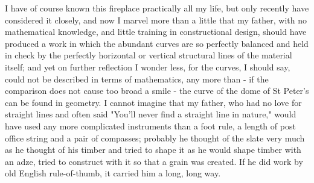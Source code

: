 I have of course known this fireplace practically all my life, but only recently have considered it closely, and now I marvel more than a little that my father, with no mathematical knowledge, and little training in constructional design, should have produced a work in which the abundant curves are so perfectly balanced and held in check by the perfectly horizontal or vertical structural lines of the material itself; and yet on further reflection I wonder less, for the curves, I should say, could not be described in terms of mathematics, any more than - if the comparison does not cause too broad a smile - the curve of the dome of St Peter's can be found in geometry. I cannot imagine that my father, who had no love for straight lines and often said "You'll never find a straight line in nature," would have used any more complicated instruments than a foot rule, a length of post office string and a pair of compasses; probably he thought of the slate very much as he thought of his timber and tried to shape it as he would shape timber with an adze, tried to construct with it so that a grain was created. If he did work by old English rule-of-thumb, it carried him a long, long way.